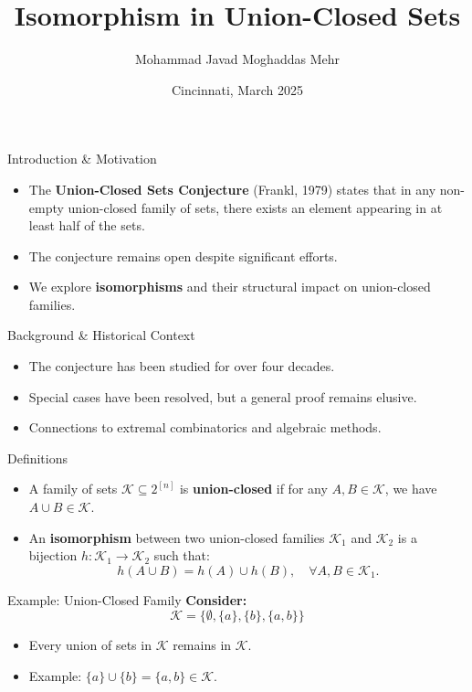 \documentclass{beamer}
\title{Isomorphism in Union-Closed Sets}
\author{Mohammad Javad Moghaddas Mehr}
\institute{Your Institution}
\date{Cincinnati, March 2025}
\begin{document}
\begin{frame}
	\titlepage
\end{frame}

\begin{frame}{Introduction & Motivation}
	\begin{itemize}
		\item The \textbf{Union-Closed Sets Conjecture} (Frankl, 1979) states that in any non-empty union-closed family of sets, there exists an element appearing in at least half of the sets.
		\item The conjecture remains open despite significant efforts.
		\item We explore \textbf{isomorphisms} and their structural impact on union-closed families.
	\end{itemize}
\end{frame}

\begin{frame}{Background & Historical Context}
	\begin{itemize}
		\item The conjecture has been studied for over four decades.
		\item Special cases have been resolved, but a general proof remains elusive.
		\item Connections to extremal combinatorics and algebraic methods.
	\end{itemize}
\end{frame}

\begin{frame}{Definitions}
	\begin{itemize}
		\item A family of sets $\mathcal{K} \subseteq 2^{[n]}$ is \textbf{union-closed} if for any $A, B \in \mathcal{K}$, we have $A \cup B \in \mathcal{K}$.
		\item An \textbf{isomorphism} between two union-closed families $\mathcal{K}_1$ and $\mathcal{K}_2$ is a bijection $h: \mathcal{K}_1 \to \mathcal{K}_2$ such that:
		      \[ h(A \cup B) = h(A) \cup h(B), \quad \forall A, B \in \mathcal{K}_1. \]
	\end{itemize}
\end{frame}

\begin{frame}{Example: Union-Closed Family}
	\textbf{Consider:}
	\[ \mathcal{K} = \{\emptyset, \{a\}, \{b\}, \{a,b\} \} \]
	\begin{itemize}
		\item Every union of sets in $\mathcal{K}$ remains in $\mathcal{K}$.
		\item Example: $\{a\} \cup \{b\} = \{a, b\} \in \mathcal{K}$.
	\end{itemize}
\end{frame}
\end{document}
